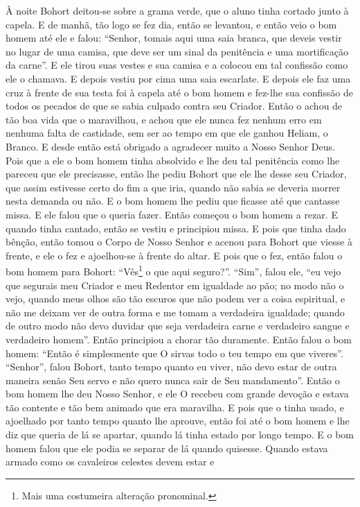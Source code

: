 À noite Bohort deitou-se sobre a grama verde, que o aluno tinha cortado junto à
capela. E de manhã, tão logo se fez dia, então se levantou, e então veio o bom
homem até ele e falou: “Senhor, tomais aqui uma saia branca, que deveis vestir
no lugar de uma camisa, que deve ser um sinal da penitência e uma mortificação
da carne”. E ele tirou suas vestes e sua camisa e a colocou em tal
confissão como ele o chamava. E depois vestiu por cima uma saia escarlate. E
depois ele faz uma cruz à frente de sua testa foi à capela até o bom homem e
fez-lhe sua confissão de todos os pecados de que se sabia culpado contra seu
Criador. Então o achou de tão boa vida que o maravilhou, e achou que ele nunca
fez nenhum erro em nenhuma falta de castidade, sem ser ao tempo em que ele
ganhou Heliam, o Branco. E desde então está obrigado a agradecer muito a Nosso
Senhor Deus. Pois que a ele o bom homem tinha absolvido e lhe deu tal
penitência como lhe pareceu que ele precisasse, então lhe pediu Bohort que ele
lhe desse seu Criador, que assim estivesse certo do fim a que iria, quando não
sabia se deveria morrer nesta demanda ou não. E o bom homem lhe pediu que
ficasse até que cantasse missa. E ele falou que o queria fazer. Então começou o
bom homem a rezar. E quando tinha cantado, então se vestiu e principiou missa.
E pois que tinha dado bênção, então tomou o Corpo de Nosso Senhor e acenou para
Bohort que viesse à frente, e ele o fez e ajoelhou-se à frente do altar. E pois
que o fez, então falou o bom homem para Bohort: “Vês\footnote{ Mais uma
costumeira alteração pronominal.}  o que aqui seguro?”. “Sim”,
falou ele, “eu vejo que segurais meu Criador e meu Redentor em igualdade ao
pão; no modo não o vejo, quando meus olhos são tão escuros que não podem ver a
coisa espiritual, e não me deixam ver de outra forma e me tomam a verdadeira
igualdade; quando de outro modo não devo duvidar que seja verdadeira carne e
verdadeiro sangue e verdadeiro homem”. Então principiou a chorar tão
duramente. Então falou o bom homem: “Então é simplesmente que O sirvas todo o
teu tempo em que viveres”. “Senhor”, falou Bohort, tanto tempo quanto eu viver,
não devo estar de outra maneira senão Seu servo e não quero nunca sair de Seu
mandamento”. Então o bom homem lhe deu Nosso Senhor, e ele O recebeu
com grande devoção e estava tão contente e tão bem animado que era maravilha. E
pois que o tinha usado, e ajoelhado por tanto tempo quanto lhe aprouve, então
foi até o bom homem e lhe diz que queria de lá se apartar, quando lá tinha
estado por longo tempo. E o bom homem falou que ele podia se separar de lá
quando quisesse. Quando estava armado como os cavaleiros celestes devem estar e
